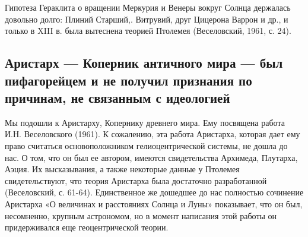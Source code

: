 Гипотеза Гераклита о вращении Меркурия и Венеры вокруг Солнца
держалась довольно долго: Плиний Старший,. Витрувий, друг Цицерона
Варрон и др., и только в XIII в. была вытеснена теорией Птолемея
(Веселовский, 1961, с. 24).

\subsection{Аристарх --- Коперник античного мира --- был пифагорейцем
и не получил признания по причинам, не связанным с идеологией}

Мы подошли к Аристарху, Копернику древнего мира. Ему посвящена
работа И.Н. Веселовского (1961). К сожалению, эта работа Аристарха,
которая дает ему право считаться основоположником гелиоцентрической
системы, не дошла до нас. О том, что он был ее автором, имеются
свидетельства Архимеда, Плутарха, Аэция. Их высказывания, а также
некоторые данные у Птолемея свидетельствуют, что теория Аристарха была
достаточно разработанной (Веселовский, с. 61-64). Единственное же
дошедшее до нас полностью сочинение Аристарха «О величинах и
расстояниях Солнца и Луны» показывает, что он был, несомненно, крупным
астрономом, но в момент написания этой работы он придерживался еще
геоцентрической теории.

